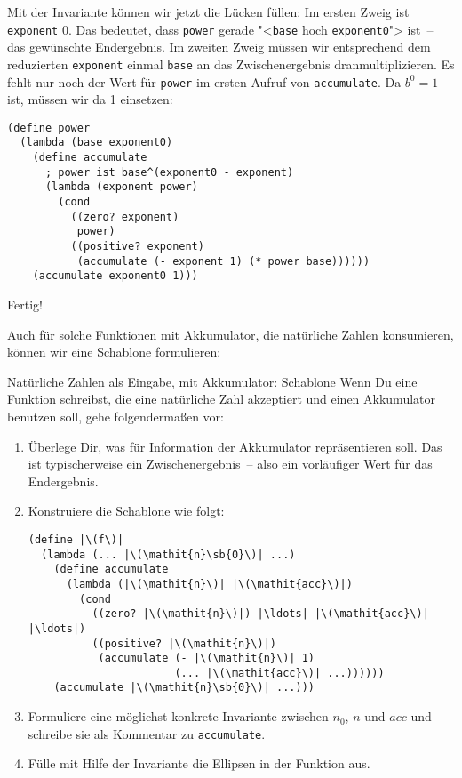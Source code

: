 Mit der Invariante können wir jetzt die Lücken füllen: Im ersten Zweig
ist \lstinline{exponent} 0.  Das bedeutet, dass \lstinline{power}
gerade "<\lstinline{base} hoch \lstinline{exponent0}"> ist~-- das
gewünschte Endergebnis.  Im zweiten Zweig müssen wir entsprechend dem
reduzierten \lstinline{exponent} einmal \lstinline{base} an das
Zwischenergebnis dranmultiplizieren.  Es fehlt nur noch der Wert
für \lstinline{power} im ersten Aufruf von \lstinline{accumulate}.  Da
$b^0 = 1$ ist, müssen wir da 1 einsetzen:
%
\begin{lstlisting}
(define power
  (lambda (base exponent0)
    (define accumulate
      ; power ist base^(exponent0 - exponent)
      (lambda (exponent power)
        (cond
          ((zero? exponent)
           power)
          ((positive? exponent)
           (accumulate (- exponent 1) (* power base))))))
    (accumulate exponent0 1)))
\end{lstlisting}
%
Fertig!

Auch für solche Funktionen mit Akkumulator, die natürliche Zahlen
konsumieren, können wir eine Schablone formulieren:

\begin{konstruktionsanleitung}{Natürliche Zahlen als Eingabe, mit Akkumulator: Schablone}
  \label{ka:natzahlen-eingabe-akkumulator-schablone}
  Wenn Du eine Funktion schreibst, die eine natürliche Zahl akzeptiert und
  einen Akkumulator benutzen soll, gehe folgendermaßen vor:
  \begin{enumerate}
  \item Überlege Dir, was für Information der Akkumulator
    repräsentieren soll. Das ist typischerweise ein
    Zwischenergebnis~-- also ein vorläufiger Wert für das Endergebnis.
  \item Konstruiere die Schablone wie folgt:
\begin{lstlisting}
(define |\(f\)|
  (lambda (... |\(\mathit{n}\sb{0}\)| ...)
    (define accumulate
      (lambda (|\(\mathit{n}\)| |\(\mathit{acc}\)|)
        (cond
          ((zero? |\(\mathit{n}\)|) |\ldots| |\(\mathit{acc}\)| |\ldots|)
          ((positive? |\(\mathit{n}\)|)
           (accumulate (- |\(\mathit{n}\)| 1) 
                       (... |\(\mathit{acc}\)| ...))))))
    (accumulate |\(\mathit{n}\sb{0}\)| ...)))
\end{lstlisting}
    \item Formuliere eine möglichst konkrete Invariante zwischen
      $\mathit{n}_0$, $\mathit{n}$ und $\mathit{acc}$ und
      schreibe sie als Kommentar zu \lstinline{accumulate}.
    \item Fülle mit Hilfe der Invariante die Ellipsen in der Funktion aus.
  \end{enumerate}
\end{konstruktionsanleitung}

